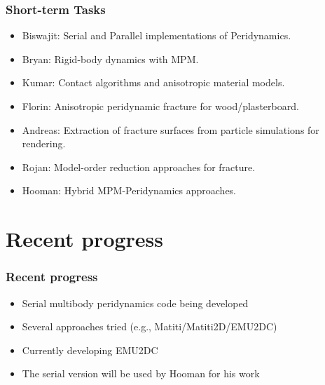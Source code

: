 \documentclass[a4paper]{beamer}
\begin{document}
    \begin{frame}
      \frametitle{Short-term Tasks}
      \begin{itemize}
        \item {\Grey Biswajit:} Serial and Parallel implementations of Peridynamics.
        \item {\Grey Bryan:} Rigid-body dynamics with MPM.
        \item {\Grey Kumar:} Contact algorithms and anisotropic material models.
        \item {\Grey Florin:} Anisotropic peridynamic fracture for wood/plasterboard.
        \item {\Grey Andreas:} Extraction of fracture surfaces from particle simulations for rendering.
        \item {\Grey Rojan:} Model-order reduction approaches for fracture.
        \item {\Grey Hooman:} Hybrid MPM-Peridynamics approaches.
      \end{itemize}
    \end{frame}

  \section{Recent progress}

    \begin{frame}
      \frametitle{Recent progress}
      \begin{itemize}
        \item Serial multibody peridynamics code being developed
        \item Several approaches tried (e.g., Matiti/Matiti2D/EMU2DC)
        \item Currently developing EMU2DC 
        \item The serial version will be used by Hooman for his work
      \end{itemize}
    \end{frame}
\end{document}
